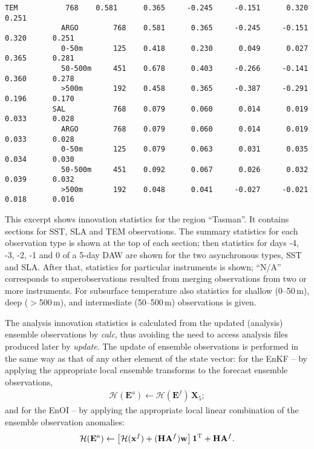 \documentclass[11pt]{report}
\newcommand{\mb} {\mathbf}
\newcommand{\T}{^{\tiny \mathrm T}}
\begin{document}
\begin{Verbatim}[frame=single,fontsize=\footnotesize]
           TEM           768    0.581      0.365     -0.245     -0.151      0.320      0.251  
             ARGO        768    0.581      0.365     -0.245     -0.151      0.320      0.251  
             0-50m       125    0.418      0.230      0.049      0.027      0.365      0.281  
             50-500m     451    0.678      0.403     -0.266     -0.141      0.360      0.278  
             >500m       192    0.458      0.365     -0.387     -0.291      0.196      0.170  
           SAL           768    0.079      0.060      0.014      0.019      0.033      0.028  
             ARGO        768    0.079      0.060      0.014      0.019      0.033      0.028  
             0-50m       125    0.079      0.063      0.031      0.035      0.034      0.030  
             50-500m     451    0.092      0.067      0.026      0.032      0.039      0.032  
             >500m       192    0.048      0.041     -0.027     -0.021      0.018      0.016  
\end{Verbatim}
This excerpt shows innovation statistics for the region ``Tasman''.
It contains sections for SST, SLA and TEM observations.
The summary statistics for each observation type is shown at the top of each section; then statistics for days -4, -3, -2, -1 and 0 of a 5-day DAW are shown for the two asynchronous types, SST and SLA.
After that, statistics for particular instruments is shown; ``N/A'' corresponds to superobservations resulted from merging observations from two or more instruments.
For subsurface temperature also statistics for shallow (0--50\,m), deep ($>$500\,m), and intermediate (50--500\,m) observations is given.

The analysis innovation statistics is calculated from the updated (analysis) ensemble observations by \emph{calc}, thus avoiding the need to access analysis files produced later by \emph{update}.
The update of ensemble observations is performed in the same way as that of any other element of the state vector:
for the EnKF -- by applying the appropriate local ensemble transforms to the forecast ensemble observations,
\begin{align*}
  \mathcal H (\mb E^a) \leftarrow \mathcal H (\mb E^f) \, \mb X_5;
\end{align*}
and for the EnOI -- by applying the appropriate local linear combination of the ensemble observation anomalies:
\begin{align*}
  \mathcal H (\mb E^a) \leftarrow \left[ \mathcal H (\mb x^f) + (\mb H \mb A^f) \mb w\right] \mb 1\T + \mb H \mb A^f.
\end{align*}
\end{document}
